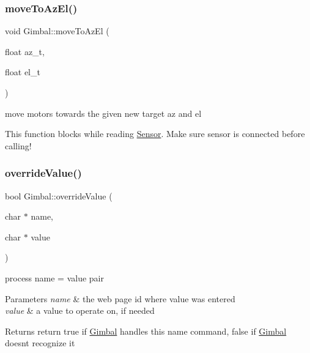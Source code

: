 \subsubsection{\texorpdfstring{move\+To\+Az\+El()}{moveToAzEl()}}
{\footnotesize\ttfamily void Gimbal\+::move\+To\+Az\+El (\begin{DoxyParamCaption}\item[{float}]{az\+\_\+t,  }\item[{float}]{el\+\_\+t }\end{DoxyParamCaption})}



move motors towards the given new target az and el 

This function blocks while reading \hyperlink{class_sensor}{Sensor}. Make sure sensor is connected before calling! \mbox{\label{class_gimbal_a121d20adcddc320e78d5aa391189d0b6}} 
\subsubsection{\texorpdfstring{override\+Value()}{overrideValue()}}
{\footnotesize\ttfamily bool Gimbal\+::override\+Value (\begin{DoxyParamCaption}\item[{char $\ast$}]{name,  }\item[{char $\ast$}]{value }\end{DoxyParamCaption})}



process name = value pair 


\begin{DoxyParams}{Parameters}
{\em name} & the web page id where value was entered \\
\hline
{\em value} & a value to operate on, if needed \\
\hline
\end{DoxyParams}
\begin{DoxyReturn}{Returns}
return true if \hyperlink{class_gimbal}{Gimbal} handles this \textquotesingle{}name\textquotesingle{} command, false if \hyperlink{class_gimbal}{Gimbal} doesn\textquotesingle{}t recognize it 
\end{DoxyReturn}
\mbox{\label{class_gimbal_ab77d72c96b391e64b6c08bb3fa6c7f49}} 
